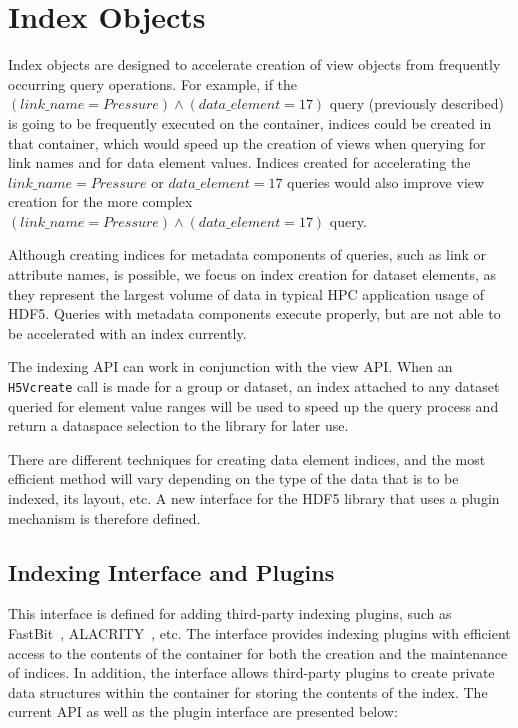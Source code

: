 \documentclass[letterpaper,hyper]{THG_RFC}
\begin{document}
\section{Index Objects}
Index objects are designed to accelerate creation of view objects from
frequently occurring query operations.
For example, if the $(link\_name = Pressure)\land(data\_element = 17)$ query
(previously described) is going to be frequently executed on the container, indices
could be created in that container, which would speed up the creation of views
when querying for link names and for data element values. Indices created for
accelerating the $link\_name = Pressure$ or $data\_element = 17$ queries
would also improve view creation for the more complex
$(link\_name = Pressure)\land(data\_element = 17)$ query.

Although creating indices for metadata components of queries, such as link or
attribute names, is possible, we focus on index creation for dataset elements,
as they represent the largest volume of data in typical HPC application usage of
HDF5. Queries with metadata components execute properly,
 but are not able to be accelerated
with an index currently.

The indexing API can work in conjunction with the view API. When an \texttt{H5Vcreate}
call is made for a group or dataset, an index attached to any dataset queried
for element value ranges will be used to speed up the query process and return
a dataspace selection to the library for later use.

There are different techniques for creating data element indices, and the most
efficient method will vary depending on the type of the data that is to be
indexed, its layout, etc. A new interface for the HDF5 library that uses a
plugin mechanism is therefore defined.

\subsection{Indexing Interface and Plugins}

This interface is defined for adding third-party indexing plugins,
such as FastBit~\cite{Wu05}, ALACRITY~\cite{alacrity13}, etc.
The interface provides indexing plugins with efficient access to the contents of
the container for both the creation and the maintenance of indices. In addition,
the interface allows third-party plugins to create private data structures
within the container for storing the contents of the index.
The current API as well as the plugin interface are presented below:
\end{document}
